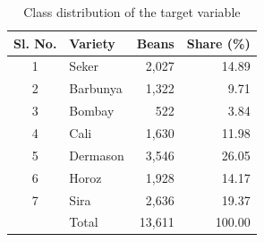 \begin{table}[htbp]
\centering
\small
\caption{Class distribution of the target variable}
\label{tab:class_counts}
\begin{tabular}{clrr}
\toprule
Sl. No. & Variety & Beans & Share (\%) \\
\midrule
1 & Seker & 2,027 & 14.89 \\
2 & Barbunya & 1,322 & 9.71 \\
3 & Bombay & 522 & 3.84 \\
4 & Cali & 1,630 & 11.98 \\
5 & Dermason & 3,546 & 26.05 \\
6 & Horoz & 1,928 & 14.17 \\
7 & Sira & 2,636 & 19.37 \\
\midrule
 & Total & 13,611 & 100.00 \\
\bottomrule
\end{tabular}
\end{table}
